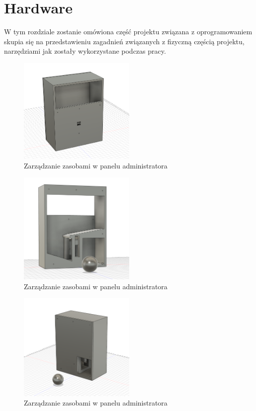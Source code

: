 \chapter{Hardware}
\label{ch:funplenop}
W tym rozdziale zostanie omówiona część projektu związana z oprogramowaniem
skupia się na przedstawieniu zagadnień związanych z fizyczną częścią projektu, narzędziami jak zostały wykorzystane podczas pracy.

\lipsum[1]

\begin{figure}[h!]
  \centering
    \includegraphics[width=0.5\textwidth]{images/3D/gate_front.png}
  \caption{Zarządzanie zasobami w panelu administratora}
  \label{fig:mobile}
\end{figure}

\begin{figure}[h!]
  \centering
    \includegraphics[width=0.5\textwidth]{images/3D/gate_inside.png}
  \caption{Zarządzanie zasobami w panelu administratora}
  \label{fig:mobile}
\end{figure}

\begin{figure}[h!]
  \centering
    \includegraphics[width=0.5\textwidth]{images/3D/gate_with_back.png}
  \caption{Zarządzanie zasobami w panelu administratora}
  \label{fig:mobile}
\end{figure}

